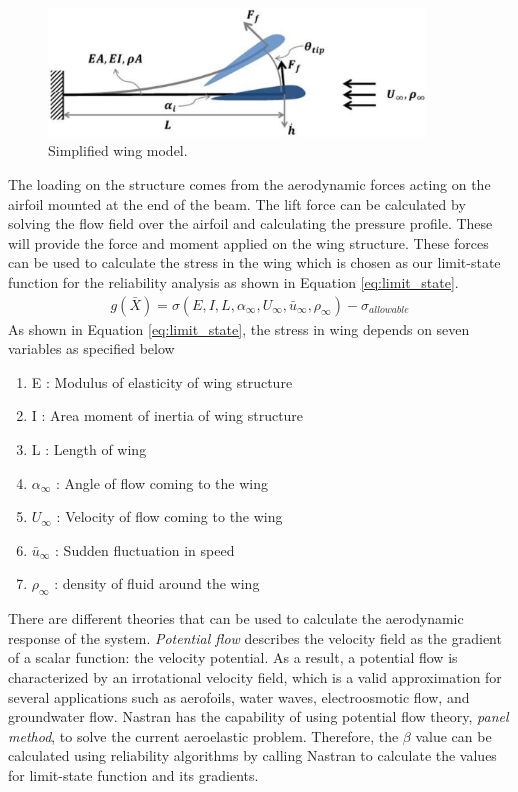 \documentclass[paper=a4, fontsize=12pt]{scrartcl} %
\begin{document}
%
\begin{figure}[H]
	\centering
    \includegraphics[width=10cm]{problem_discription.jpg}
    \caption{Simplified wing model.}
    \label{fig:problem_discription}
\end{figure}
%
The loading on the structure comes from the aerodynamic forces acting on the airfoil mounted at the end of the beam. The lift force can be calculated by solving the flow field over the airfoil and calculating the pressure profile. These will provide the force and moment applied on the wing structure. These forces can be used to calculate the stress in the wing which is chosen as our limit-state function for the reliability analysis as shown in Equation \eqref{eq:limit_state}.
%
\begin{gather}
	g\left( \bar{X} \right) = 
	\sigma\left( E,I,L,\alpha_\infty,U_\infty,\bar{u}_\infty,\rho_\infty \right)
	- \sigma_{allowable}
	\label{eq:limit_state}
\end{gather}
%
As shown in Equation \eqref{eq:limit_state}, the stress in wing depends on seven variables as specified below
%
\begin{enumerate}
	\item E \quad : \quad Modulus of elasticity of wing structure
	\item I \quad : \quad Area moment of inertia of wing structure
	\item L \quad : \quad Length of wing
	\item $\alpha_\infty$ \quad : \quad Angle of flow coming to the wing
	\item $U_\infty$ \quad : \quad Velocity of flow coming to the wing
	\item $\bar{u}_\infty$ \quad : \quad Sudden fluctuation in speed
	\item $\rho_\infty$ \quad : \quad density of fluid around the wing
\end{enumerate}
%
There are different theories that can be used to calculate the aerodynamic response of the system. \emph{Potential flow} describes the velocity field as the gradient of a scalar function: the velocity potential. As a result, a potential flow is characterized by an irrotational velocity field, which is a valid approximation for several applications such as aerofoils, water waves, electroosmotic flow, and groundwater flow. Nastran has the capability of using potential flow theory, \emph{panel method}, to solve the current aeroelastic problem. Therefore, the $\beta$ value can be calculated using reliability algorithms by calling Nastran to calculate the values for limit-state function and its gradients.\\
\end{document}
